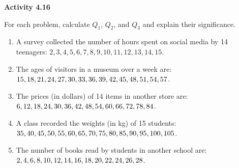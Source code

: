 \vspace{0.3ex}
\noindent\textbf{Activity 4.16}

\vspace{0.2ex}

For each problem, calculate \(Q_1\), \(Q_2\), and \(Q_3\) and explain their significance.

\begin{enumerate}
    \item A survey collected the number of hours spent on social media by 14 teenagers: \(2, 3, 4, 5, 6, 7, 8, 9, 10, 11, 12, 13, 14, 15\). 
    \item The ages of visitors in a museum over a week are: \(15, 18, 21, 24, 27, 30, 33, 36,\\ 39, 42, 45, 48, 51, 54, 57\). 
    \item The prices (in dollars) of 14 items in another store are: \(6, 12, 18, 24, 30, 36, 42,\\ 48, 54, 60, 66, 72, 78, 84\). 
    \item A class recorded the weights (in kg) of 15 students: \(35, 40, 45, 50, 55, 60, 65,\\ 70, 75, 80, 85, 90, 95, 100, 105\). 
    \item The number of books read by students in another school are: \(2, 4, 6, 8, 10, 12,\\ 14, 16, 18, 20, 22, 24, 26, 28\). 
\end{enumerate}
